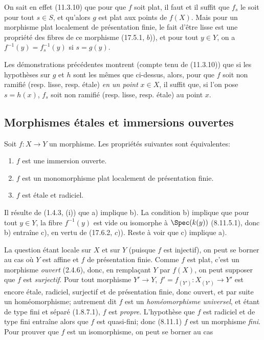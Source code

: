 On sait en effet (11.3.10) que pour que $f$ soit plat, il faut et il suffit que $f_s$ le soit pour tout $s\in S$, et qu'alors $g$ est plat aux points de $f(X)$. Mais pour un morphisme plat localement de présentation finie, le fait d'être lisse est une propriété des fibres de ce morphisme (17.5.1, $b$)), et pour tout $y\in Y$, on a $f^{-1}(y)=f_s^{-1}(y)$ si $s=g(y)$.

\begin{remark}[17.8.3]
\label{IV.17.8.3}
Les démonstrations précédentes montrent (compte tenu de (11.3.10)) que si les hypothèses sur $g$ et $h$ sont les mêmes que ci-dessus, alors, pour que $f$ soit non ramifié (resp. lisse, resp. étale) \emph{en un point} $x\in X$, il suffit que, si l'on pose $s=h(x)$, $f_s$ soit non ramifié (resp. lisse, resp. étale) au point $x$.
\end{remark}

\subsection{Morphismes étales et immersions ouvertes}
\label{subsection:IV.17.9}
\label{IV.17.9}

\begin{theorem}[17.9.1]
\label{IV.17.9.1}
Soit $f:X\to Y$ un morphisme. Les propriétés suivantes sont équivalentes:
\begin{enumerate}
  \item[a)] $f$ est une immersion ouverte.
  \item[b)] $f$ est un monomorphisme plat localement de présentation finie.
  \item[c)] $f$ est étale et radiciel.
\end{enumerate}
\end{theorem}

Il résulte de (1.4.3, (i)) que a) implique b). La condition b) implique que pour tout $y\in Y$, la fibre $f^{-1}(y)$ est vide ou isomorphe à $\Spec(k(y))$ (8.11.5.1), donc b) entraîne c), en vertu de (17.6.2, $c$)). Reste à voir que c) implique a).

La question étant locale sur $X$ et sur $Y$ (puisque $f$ est injectif), on peut se borner au cas où $Y$ est affine et $f$ de présentation finie. Comme $f$ est plat, c'est un morphisme \emph{ouvert} (2.4.6), donc, en remplaçant $Y$ par $f(X)$, on peut supposer que $f$ est \emph{surjectif}. Pour tout morphisme $Y'\to Y$, $f'=f_{(Y')}:X_{(Y')}\to Y'$ est encore étale, radiciel, surjectif et de présentation finie, donc ouvert, et par suite un homéomorphisme; autrement dit $f$ est un \emph{homéomorphisme universel}, et étant de type fini et séparé (1.8.7.1), $f$ est \emph{propre}. L'hypothèse que $f$ est radiciel et de type fini entraîne alors que $f$ est quasi-fini; donc (8.11.1) $f$ est un morphisme \emph{fini}. Pour prouver que $f$ est un isomorphisme, on peut se borner au cas

